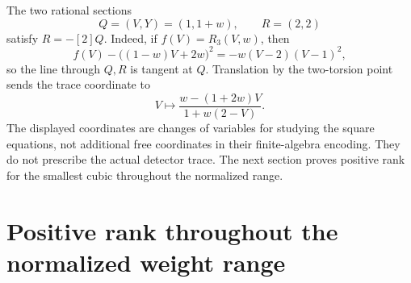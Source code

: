 \documentclass[11pt,a4paper]{article}
\begin{document}
The two rational sections
\[
 Q=(V,Y)=(1,1+w),\qquad R=(2,2)
\]
satisfy $R=-[2]Q$. Indeed, if $f(V)=R_3(V,w)$, then
\[
 f(V)-\bigl((1-w)V+2w\bigr)^2=-w(V-2)(V-1)^2,
\]
so the line through $Q,R$ is tangent at $Q$. Translation by the
two-torsion point sends the trace coordinate to
\[
                V\longmapsto
                \frac{w-(1+2w)V}{1+w(2-V)}.
\]
The displayed coordinates are changes of variables for studying the
square equations, not additional free coordinates in their finite-algebra
encoding. They do not prescribe the actual detector trace. The next
section proves positive rank for the smallest cubic throughout the
normalized range.

\section{Positive rank throughout the normalized weight range}
\end{document}
